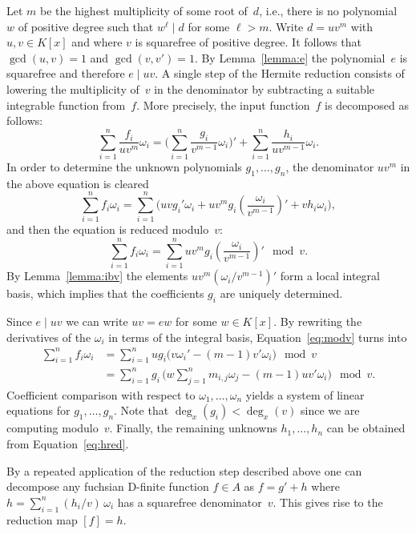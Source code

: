 \documentclass{sig-alternate}
\begin{document}
Let $m$ be the highest multiplicity of some root of~$d$, i.e., there is no
polynomial~$w$ of positive degree such that $w^\ell\mid d$ for some $\ell>m$.
Write $d=uv^m$ with $u,v\in K[x]$ and where $v$ is squarefree of positive
degree.  It follows that $\gcd(u,v)=1$ and $\gcd(v,v')=1$. By
Lemma~\ref{lemma:e} the polynomial~$e$ is squarefree and therefore $e\mid uv$.
A single step of the Hermite reduction consists of lowering the multiplicity
of~$v$ in the denominator by subtracting a suitable integrable function
from~$f$. More precisely, the input function~$f$ is decomposed as follows:
\begin{equation}\label{eq:hred}
  \sum_{i=1}^n \frac{f_i}{uv^m}\omega_i =
  \biggl(\sum_{i=1}^n\frac{g_i}{v^{m-1}}\omega_i\biggr)' +
  \sum_{i=1}^n \frac{h_i}{uv^{m-1}}\omega_i.
\end{equation}
In order to determine the unknown polynomials $g_1,\ldots,g_n$, the
denominator $uv^m$ in the above equation is cleared
\[
  \sum_{i=1}^n f_i\omega_i = \sum_{i=1}^n \biggl( uvg_i'\omega_i +
  uv^mg_i\left(\frac{\omega_i}{v^{m-1}}\right)' + vh_i\omega_i \biggr),
\]
and then the equation is reduced modulo~$v$:
\begin{equation}\label{eq:modv}
  \sum_{i=1}^n f_i\omega_i =
  \sum_{i=1}^n uv^mg_i\left(\frac{\omega_i}{v^{m-1}}\right)' \mod v.
\end{equation}
By Lemma~\ref{lemma:ibv} the elements $uv^m(\omega_i/v^{m-1})'$ form a local
integral basis, which implies that the coefficients $g_i$ are uniquely
determined.

Since $e\mid uv$ we can write $uv=ew$ for some $w\in K[x]$. By rewriting the
derivatives of the $\omega_i$ in terms of the integral basis,
Equation~\eqref{eq:modv} turns into
\begin{align*}
  \sum_{i=1}^n f_i\omega_i
  &= \sum_{i=1}^n ug_i \bigl( v\omega_i' - (m-1)v'\omega_i \bigr) \mod v\\
  &= \sum_{i=1}^n g_i\, \biggl( w\sum_{j=1}^n m_{i,j}\omega_j - (m-1)uv'\omega_i \biggr) \mod v.
\end{align*}
Coefficient comparison with respect to $\omega_1,\ldots,\omega_n$ yields a
system of linear equations for $g_1,\ldots,g_n$. Note that $\deg_x(g_i)<\deg_x(v)$
since we are computing modulo~$v$. Finally, the remaining unknowns
$h_1,\ldots,h_n$ can be obtained from Equation~\eqref{eq:hred}.

By a repeated application of the reduction step described above
one can decompose any fuchsian D-finite function $f\in A$ as
$f=g'+h$ where $h=\sum_{i=1}^n (h_i/v)\,\omega_i$ has a squarefree
denominator~$v$. This gives rise to the reduction map $[f]=h$.
\end{document}
